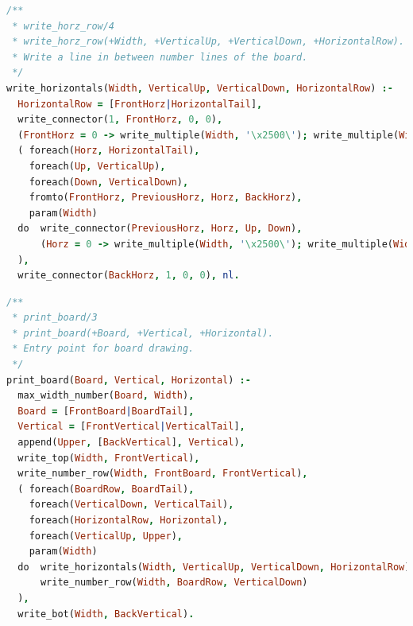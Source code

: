 \documentclass[runningheads]{llncs}
\begin{document}
\begin{center}
\begin{minipage}{0.85\textwidth}
\centering\ttfamily
\begin{lstlisting}[language=Prolog]
/**
 * write_horz_row/4
 * write_horz_row(+Width, +VerticalUp, +VerticalDown, +HorizontalRow).
 * Write a line in between number lines of the board.
 */
write_horizontals(Width, VerticalUp, VerticalDown, HorizontalRow) :-
  HorizontalRow = [FrontHorz|HorizontalTail],
  write_connector(1, FrontHorz, 0, 0),
  (FrontHorz = 0 -> write_multiple(Width, '\x2500\'); write_multiple(Width, ' ')),
  ( foreach(Horz, HorizontalTail),
    foreach(Up, VerticalUp),
    foreach(Down, VerticalDown),
    fromto(FrontHorz, PreviousHorz, Horz, BackHorz),
    param(Width)
  do  write_connector(PreviousHorz, Horz, Up, Down),
      (Horz = 0 -> write_multiple(Width, '\x2500\'); write_multiple(Width, ' '))
  ),
  write_connector(BackHorz, 1, 0, 0), nl.
\end{lstlisting}
\end{minipage}
\end{center}

\begin{center}
\begin{minipage}{0.85\textwidth}
\centering\ttfamily
\begin{lstlisting}[language=Prolog]
/**
 * print_board/3
 * print_board(+Board, +Vertical, +Horizontal).
 * Entry point for board drawing.
 */
print_board(Board, Vertical, Horizontal) :-
  max_width_number(Board, Width),
  Board = [FrontBoard|BoardTail],
  Vertical = [FrontVertical|VerticalTail],
  append(Upper, [BackVertical], Vertical),
  write_top(Width, FrontVertical),
  write_number_row(Width, FrontBoard, FrontVertical),
  ( foreach(BoardRow, BoardTail),
    foreach(VerticalDown, VerticalTail),
    foreach(HorizontalRow, Horizontal),
    foreach(VerticalUp, Upper),
    param(Width)
  do  write_horizontals(Width, VerticalUp, VerticalDown, HorizontalRow),
      write_number_row(Width, BoardRow, VerticalDown)
  ),
  write_bot(Width, BackVertical).

\end{lstlisting}
\end{minipage}
\end{center}
\end{document}
